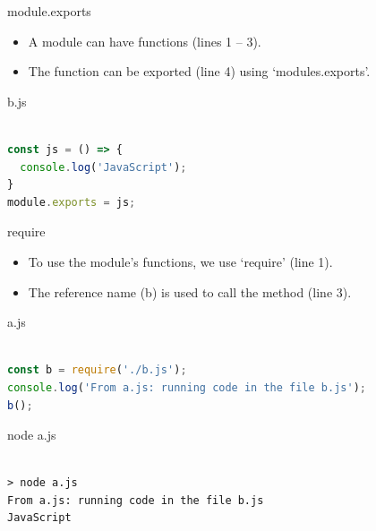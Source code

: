
\begin{frame}[fragile]{module.exports}

\begin{itemize}
	\item A module can have functions (lines 1 -- 3).
	\item The function can be exported (line 4) using `modules.exports'. 
\end{itemize}

\begin{Code}{b.js}%
\begin{lstlisting}[language=javascript, firstnumber=1, label=glabels, xleftmargin=0pt, basicstyle=\scriptsize]% 

const js = () => {
  console.log('JavaScript');
}
module.exports = js;
\end{lstlisting}%
\end{Code}%

\end{frame}

\begin{frame}[fragile]{require}

\begin{itemize}
	\item To use the module's functions, we use `require' (line 1). 
	\item The reference name (b) is used to call the method (line 3). 
\end{itemize}

\begin{Code}{a.js}%
\begin{lstlisting}[language=javascript, firstnumber=1, label=glabels, xleftmargin=0pt, basicstyle=\scriptsize]% 

const b = require('./b.js');
console.log('From a.js: running code in the file b.js'); 
b();
\end{lstlisting}%
\end{Code}%

\begin{Command}{node a.js}%
\begin{lstlisting}[firstnumber=1, label=glabels, xleftmargin=0pt, basicstyle=\scriptsize]% 

> node a.js
From a.js: running code in the file b.js
JavaScript
\end{lstlisting}%
\end{Command}%
\end{frame}


